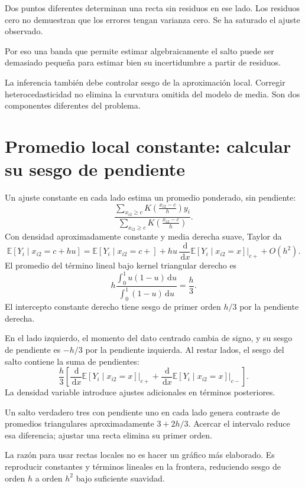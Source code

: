 \documentclass[11pt,a4paper]{article}
\newcommand{\E}{\mathbb E}
\newcommand{\dd}{\,\mathrm d}
\begin{document}
\begin{ejemplo}
Dos puntos diferentes determinan una recta
sin residuos en ese lado.
Los residuos cero no demuestran
que los errores tengan varianza cero.
Se ha saturado el ajuste observado.
\end{ejemplo}
Por eso una banda que permite estimar
algebraicamente el salto puede ser
demasiado pequeña para estimar bien
su incertidumbre a partir de residuos.

La inferencia también debe controlar sesgo
de la aproximación local.
Corregir heterocedasticidad no elimina
la curvatura omitida del modelo de media.
Son dos componentes diferentes del problema.

\clearpage
\section{Promedio local constante: calcular su sesgo de pendiente}\label{unidad31}
Un ajuste constante en cada lado estima
un promedio ponderado, sin pendiente:
\[
\frac{\sum_{x_{i2}\ge c}K(\frac{x_{i2}-c}{h})y_i}
{\sum_{x_{i2}\ge c}K(\frac{x_{i2}-c}{h})}.
\]
Con densidad aproximadamente constante
y media derecha suave, Taylor da
\[
\E[Y_i\mid x_{i2}=c+hu]
=\E[Y_i\mid x_{i2}=c+]
+hu\,\frac{\dd}{\dd x}\E[Y_i\mid x_{i2}=x]\bigg|_{c+}
+O(h^2).
\]
El promedio del término lineal bajo
kernel triangular derecho es
\[
h\frac{\int_0^1u(1-u)\dd u}
{\int_0^1(1-u)\dd u}
=\frac h3.
\]
El intercepto constante derecho tiene
sesgo de primer orden \(h/3\)
por la pendiente derecha.

En el lado izquierdo, el momento
del dato centrado cambia de signo,
y su sesgo de pendiente es \(-h/3\)
por la pendiente izquierda.
Al restar lados, el sesgo del salto
contiene la suma de pendientes:
\[
\frac h3\left[
\frac{\dd}{\dd x}\E[Y_i\mid x_{i2}=x]\bigg|_{c+}
+
\frac{\dd}{\dd x}\E[Y_i\mid x_{i2}=x]\bigg|_{c-}
\right].
\]
La densidad variable introduce ajustes
adicionales en términos posteriores.

\begin{ejemplo}
Un salto verdadero tres con pendiente
uno en cada lado genera contraste
de promedios triangulares aproximadamente
\(3+2h/3\).
Acercar el intervalo reduce esa diferencia;
ajustar una recta elimina su primer orden.
\end{ejemplo}
La razón para usar rectas locales no es
hacer un gráfico más elaborado.
Es reproducir constantes y términos lineales
en la frontera, reduciendo sesgo
de orden \(h\) a orden \(h^2\)
bajo suficiente suavidad.
\end{document}

